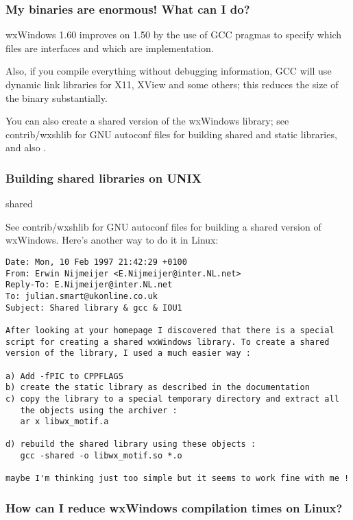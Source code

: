 \subsubsection{My binaries are enormous! What can I do?}

wxWindows 1.60 improves on 1.50 by the use of GCC pragmas to
specify which files are interfaces and which are implementation.

Also, if you compile everything without debugging information,
GCC will use dynamic link libraries for X11, XView and some others;
this reduces the size of the binary substantially.

You can also create a shared version of the wxWindows library; see
contrib/wxshlib for GNU autoconf files for building shared and
static libraries, and also .

\subsubsection{Building shared libraries on UNIX}{shared}

See contrib/wxshlib for GNU autoconf files for building a shared version
of wxWindows. Here's another way to do it in Linux:

{\small
\begin{verbatim}
Date: Mon, 10 Feb 1997 21:42:29 +0100
From: Erwin Nijmeijer <E.Nijmeijer@inter.NL.net>
Reply-To: E.Nijmeijer@inter.NL.net
To: julian.smart@ukonline.co.uk
Subject: Shared library & gcc & IOU1

After looking at your homepage I discovered that there is a special
script for creating a shared wxWindows library. To create a shared
version of the library, I used a much easier way :

a) Add -fPIC to CPPFLAGS
b) create the static library as described in the documentation
c) copy the library to a special temporary directory and extract all
   the objects using the archiver :
   ar x libwx_motif.a

d) rebuild the shared library using these objects :
   gcc -shared -o libwx_motif.so *.o

maybe I'm thinking just too simple but it seems to work fine with me !
\end{verbatim}
}

\subsubsection{How can I reduce wxWindows compilation times on Linux?}

